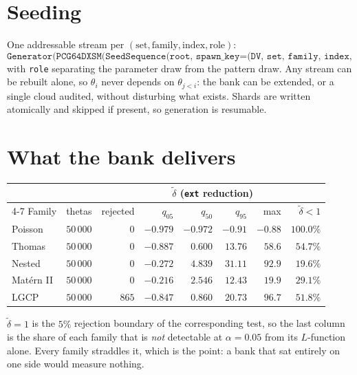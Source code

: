 \documentclass[11pt]{article}
\newcommand{\dt}{\tilde\delta}
\newcommand{\code}[1]{\texttt{#1}}
\begin{document}
\section{Seeding}
One addressable stream per $(\mathrm{set},\mathrm{family},\mathrm{index},\mathrm{role})$:
\[
  \texttt{Generator(PCG64DXSM(SeedSequence(root, spawn\_key=(DV, set, family, index, role))))}
\]
with \code{role} separating the parameter draw from the pattern draw. Any stream can be rebuilt alone, so $\theta_i$ never depends on $\theta_{j<i}$: the bank can be extended, or a single cloud audited, without disturbing what exists. Shards are written atomically and skipped if present, so generation is resumable.

\section{What the bank delivers}\label{sec:delivers}
\begin{center}
\begin{tabular}{@{}lrrrrrrr@{}}
\toprule
& & & \multicolumn{4}{c}{$\dt$ (\code{ext} reduction)} & \\
\cmidrule(lr){4-7}
Family & thetas & rejected & $q_{05}$ & $q_{50}$ & $q_{95}$ & max & $\dt<1$ \\
\midrule
Poisson     & $50\,000$ & $0$   & $-0.979$ & $-0.972$ & $-0.91$ & $-0.88$ & $100.0\%$ \\
Thomas      & $50\,000$ & $0$   & $-0.887$ & $0.600$  & $13.76$ & $58.6$  & $54.7\%$ \\
Nested      & $50\,000$ & $0$   & $-0.272$ & $4.839$  & $31.11$ & $92.9$  & $19.6\%$ \\
Mat\'ern II & $50\,000$ & $0$   & $-0.216$ & $2.546$  & $12.43$ & $19.9$  & $29.1\%$ \\
LGCP        & $50\,000$ & $865$ & $-0.847$ & $0.860$  & $20.73$ & $96.7$  & $51.8\%$ \\
\bottomrule
\end{tabular}
\end{center}

\smallskip
$\dt=1$ is the $5\%$ rejection boundary of the corresponding test, so the last column is the share of each family that is \emph{not} detectable at $\alpha=0.05$ from its $L$-function alone. Every family straddles it, which is the point: a bank that sat entirely on one side would measure nothing.
\end{document}
